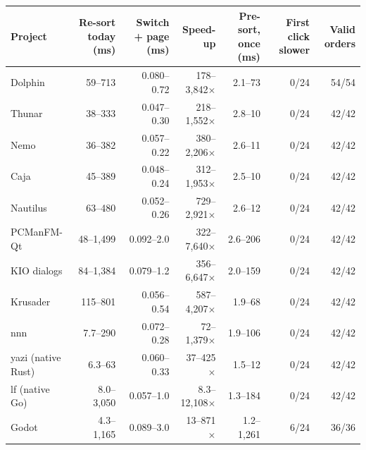 \begin{tabular}{lrrrrrr}
\toprule
Project & Re-sort today (ms) & Switch + page (ms) & Speed-up & Pre-sort, once (ms) & First click slower & Valid orders\\
\midrule
Dolphin & 59--713 & 0.080--0.72 & 178--3{,}842$\times$ & 2.1--73 & 0/24 & 54/54\\
Thunar & 38--333 & 0.047--0.30 & 218--1{,}552$\times$ & 2.8--10 & 0/24 & 42/42\\
Nemo & 36--382 & 0.057--0.22 & 380--2{,}206$\times$ & 2.6--11 & 0/24 & 42/42\\
Caja & 45--389 & 0.048--0.24 & 312--1{,}953$\times$ & 2.5--10 & 0/24 & 42/42\\
Nautilus & 63--480 & 0.052--0.26 & 729--2{,}921$\times$ & 2.6--12 & 0/24 & 42/42\\
PCManFM-Qt & 48--1{,}499 & 0.092--2.0 & 322--7{,}640$\times$ & 2.6--206 & 0/24 & 42/42\\
KIO dialogs & 84--1{,}384 & 0.079--1.2 & 356--6{,}647$\times$ & 2.0--159 & 0/24 & 42/42\\
Krusader & 115--801 & 0.056--0.54 & 587--4{,}207$\times$ & 1.9--68 & 0/24 & 42/42\\
nnn & 7.7--290 & 0.072--0.28 & 72--1{,}379$\times$ & 1.9--106 & 0/24 & 42/42\\
yazi (native Rust) & 6.3--63 & 0.060--0.33 & 37--425$\times$ & 1.5--12 & 0/24 & 42/42\\
lf (native Go) & 8.0--3{,}050 & 0.057--1.0 & 8.3--12{,}108$\times$ & 1.3--184 & 0/24 & 42/42\\
Godot & 4.3--1{,}165 & 0.089--3.0 & 13--871$\times$ & 1.2--1{,}261 & 6/24 & 36/36\\
\bottomrule
\end{tabular}
